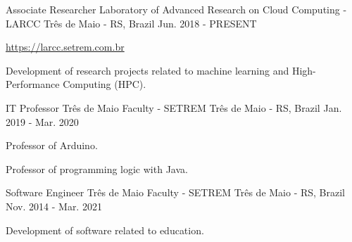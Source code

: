 
\begin{cventries}
	\cventry
	{Associate Researcher} %
	{Laboratory of Advanced Research on Cloud Computing - LARCC} %
	{Três de Maio - RS, Brazil} %
	{Jun. 2018 - PRESENT} %
	{
		\begin{cvitems} %
			\item {\href{https://larcc.setrem.com.br}{https://larcc.setrem.com.br}}
			\item {Development of research projects related to machine learning and High-Performance Computing (HPC).}
		\end{cvitems}
	}

	\cventry
	{IT Professor} %
	{Três de Maio Faculty - SETREM} %
	{Três de Maio - RS, Brazil} %
	{Jan. 2019 - Mar. 2020} %
	{
		\begin{cvitems} %
			\item {Professor of Arduino.}
			\item {Professor of programming logic with Java.}
		\end{cvitems}
	}


	\cventry
	{Software Engineer} %
	{Três de Maio Faculty - SETREM} %
	{Três de Maio - RS, Brazil} %
	{Nov. 2014 - Mar. 2021} %
	{
		\begin{cvitems} %
			\item {Development of software related to education.}
		\end{cvitems}
	}
\end{cventries}
